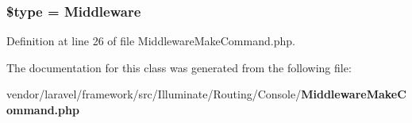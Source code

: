 \subsubsection[{\$type}]{\setlength{\rightskip}{0pt plus 5cm}\$type = \textquotesingle{}Middleware\textquotesingle{}\hspace{0.3cm}{\ttfamily [protected]}}\label{class_illuminate_1_1_routing_1_1_console_1_1_middleware_make_command_a9a4a6fba2208984cabb3afacadf33919}


Definition at line 26 of file Middleware\+Make\+Command.\+php.



The documentation for this class was generated from the following file\+:\begin{DoxyCompactItemize}
\item 
vendor/laravel/framework/src/\+Illuminate/\+Routing/\+Console/{\bf Middleware\+Make\+Command.\+php}\end{DoxyCompactItemize}
